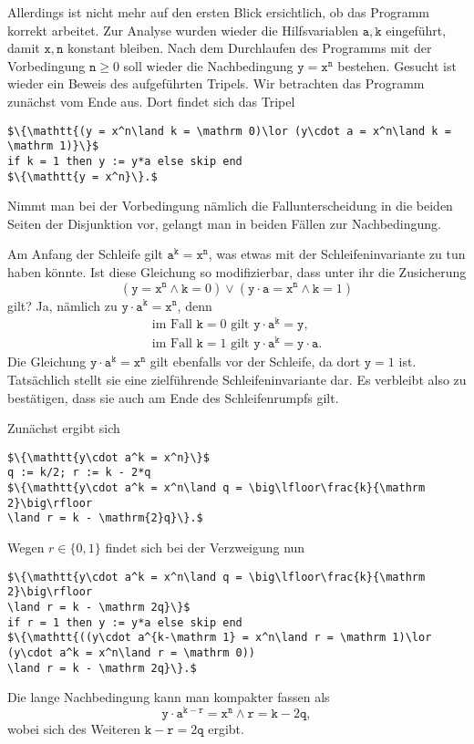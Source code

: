 Allerdings ist nicht mehr auf den ersten Blick ersichtlich, ob das
Programm korrekt arbeitet. Zur Analyse wurden wieder die
Hilfsvariablen $\mathtt{a,k}$ eingeführt, damit $\mathtt{x,n}$ konstant
bleiben. Nach dem Durchlaufen des Programms mit der Vorbedingung
$\mathtt n\ge 0$ soll wieder die Nachbedingung $\mathtt{y=x^n}$ bestehen.
Gesucht ist wieder ein Beweis des aufgeführten Tripels. Wir betrachten das
Programm zunächst vom Ende aus. Dort findet sich das Tripel
\begin{lstlisting}[language=IMP, xleftmargin=\mathindent, mathescape]
$\{\mathtt{(y = x^n\land k = \mathrm 0)\lor (y\cdot a = x^n\land k = \mathrm 1)}\}$
if k = 1 then y := y*a else skip end
$\{\mathtt{y = x^n}\}.$
\end{lstlisting}
Nimmt man bei der Vorbedingung nämlich die Fallunterscheidung in die
beiden Seiten der Disjunktion vor, gelangt man in beiden Fällen
zur Nachbedingung.

Am Anfang der Schleife gilt $\mathtt{a^k = x^n}$, was etwas mit der
Schleifeninvariante zu tun haben könnte. Ist diese Gleichung so
modifizierbar, dass unter ihr die Zusicherung
\[\mathtt{(y = x^n\land k = \mathrm 0)\lor (y\cdot a = x^n\land k = \mathrm 1)}\]
gilt? Ja, nämlich zu $\mathtt{y\cdot a^k = x^n}$, denn
\begin{gather*}
\text{im Fall $\mathtt k=0$ gilt $\mathtt{y\cdot a^k = y}$},\\
\text{im Fall $\mathtt k=1$ gilt $\mathtt{y\cdot a^k = y\cdot a}$}.
\end{gather*}
Die Gleichung $\mathtt{y\cdot a^k = x^n}$ gilt ebenfalls vor der
Schleife, da dort $\mathtt y = 1$ ist. Tatsächlich stellt sie eine
zielführende Schleifeninvariante dar. Es verbleibt also zu bestätigen,
dass sie auch am Ende des Schleifenrumpfs gilt.

Zunächst ergibt sich
\begin{lstlisting}[language=IMP, xleftmargin=\mathindent, mathescape]
$\{\mathtt{y\cdot a^k = x^n}\}$
q := k/2; r := k - 2*q
$\{\mathtt{y\cdot a^k = x^n\land q = \big\lfloor\frac{k}{\mathrm 2}\big\rfloor
\land r = k - \mathrm{2}q}\}.$
\end{lstlisting}

Wegen $r\in\{0,1\}$ findet sich bei der Verzweigung nun
\begin{lstlisting}[language=IMP, xleftmargin=\mathindent, mathescape]
$\{\mathtt{y\cdot a^k = x^n\land q = \big\lfloor\frac{k}{\mathrm 2}\big\rfloor
\land r = k - \mathrm 2q}\}$
if r = 1 then y := y*a else skip end
$\{\mathtt{((y\cdot a^{k-\mathrm 1} = x^n\land r = \mathrm 1)\lor
(y\cdot a^k = x^n\land r = \mathrm 0))
\land r = k - \mathrm 2q}\}.$
\end{lstlisting}
Die lange Nachbedingung kann man kompakter fassen als
\[\mathtt{y\cdot a^{k - r} = x^n\land r = k - \mathrm 2q},\]
wobei sich des Weiteren $\mathtt{k - r = \mathrm 2q}$ ergibt.


